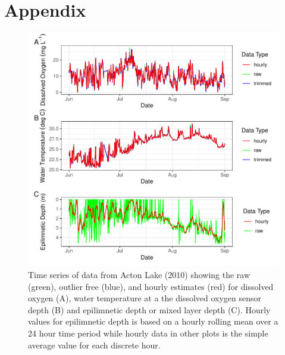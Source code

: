 \documentclass[12pt, oneside]{article}
\begin{document}
\section*{Appendix}
\renewcommand{\figurename}{Appendix}
\setcounter{figure}{0}
\begin{figure}[h]
\centering
\includegraphics{appendix1.pdf}
\caption{Time series of data from Acton Lake (2010) showing the raw (green), outlier free (blue), and hourly estimates (red) for dissolved oxygen (A), water temperature at a the dissolved oxygen sensor depth (B) and epilimnetic depth or mixed layer depth (C). Hourly values for epilimnetic depth is based on a hourly rolling mean over a 24 hour time period while hourly data in other plots is the simple average value for each discrete hour.}
\label{Appendix:appendix_trimmed}
\vspace{-20pt}
\end{figure}
\clearpage
\end{document}

